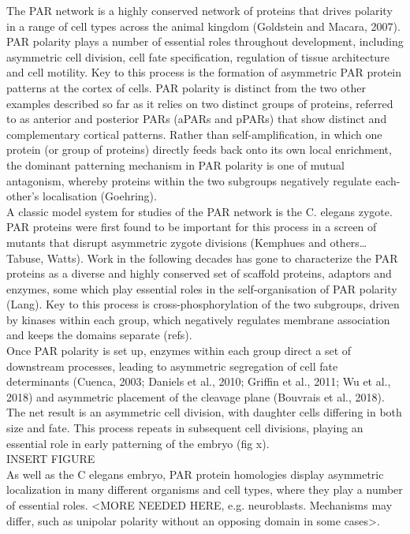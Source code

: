 \documentclass[12pt]{"article"}
\begin{document}
The PAR network is a highly conserved network of proteins that drives polarity in a range of cell types across the animal kingdom (Goldstein and Macara, 2007). PAR polarity plays a number of essential roles throughout development, including asymmetric cell division, cell fate specification, regulation of tissue architecture and cell motility. Key to this process is the formation of asymmetric PAR protein patterns at the cortex of cells. PAR polarity is distinct from the two other examples described so far as it relies on two distinct groups of proteins, referred to as anterior and posterior PARs (aPARs and pPARs) that show distinct and complementary cortical patterns. Rather than self-amplification, in which one protein (or group of proteins) directly feeds back onto its own local enrichment, the dominant patterning mechanism in PAR polarity is one of mutual antagonism, whereby proteins within the two subgroups negatively regulate each-other’s localisation (Goehring). \\

A classic model system for studies of the PAR network is the C. elegans zygote. PAR proteins were first found to be important for this process in a screen of mutants that disrupt asymmetric zygote divisions (Kemphues and others… Tabuse, Watts). Work in the following decades has gone to characterize the PAR proteins as a diverse and highly conserved set of scaffold proteins, adaptors and enzymes, some which play essential roles in the self-organisation of PAR polarity (Lang). Key to this process is cross-phosphorylation of the two subgroups, driven by kinases within each group, which negatively regulates membrane association and keeps the domains separate (refs).\\

Once PAR polarity is set up, enzymes within each group direct a set of downstream processes, leading to asymmetric segregation of cell fate determinants (Cuenca, 2003; Daniels et al., 2010; Griffin et al., 2011; Wu et al., 2018) and asymmetric placement of the cleavage plane (Bouvrais et al., 2018). The net result is an asymmetric cell division, with daughter cells differing in both size and fate. This process repeats in subsequent cell divisions, playing an essential role in early patterning of the embryo (fig x). \\

INSERT FIGURE \\

As well as the C elegans embryo, PAR protein homologies display asymmetric localization in many different organisms and cell types, where they play a number of essential roles. <MORE NEEDED HERE, e.g. neuroblasts. Mechanisms may differ, such as unipolar polarity without an opposing domain in some cases>.\\
\end{document}

